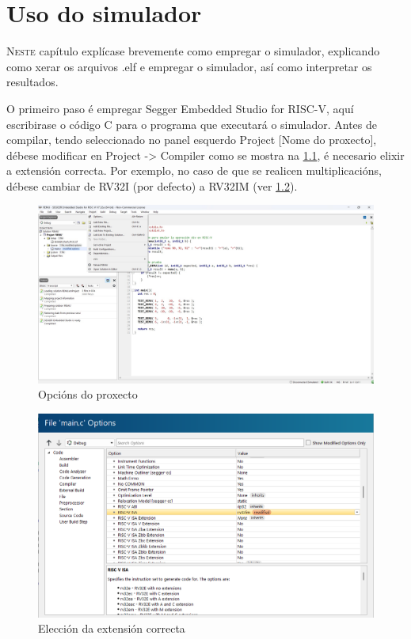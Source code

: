 \chapter{Uso do simulador}
\label{chap:uso_simulador}

\lettrine{N}{este} capítulo explícase brevemente como empregar o simulador, explicando como xerar os arquivos .elf e empregar o simulador, así como interpretar os resultados. 

O primeiro paso é empregar Segger Embedded Studio for RISC-V, aquí escribirase o código C para o programa que executará o simulador. Antes de compilar, tendo seleccionado no panel esquerdo Project [Nome do proxecto], débese modificar en Project -> Compiler como se mostra na \ref{fig:cap1}, é necesario elixir a extensión correcta. Por exemplo, no caso de que se realicen multiplicacións, débese cambiar de RV32I (por defecto) a RV32IM (ver \ref{fig:cap2}).

\begin{figure}[hp!]
  \centering
  \includegraphics[width=\textwidth]{imaxes/Cap_1.jpg}
  \caption{Opcións do proxecto}
  \label{fig:cap1}
\end{figure}

\begin{figure}[hp!]
  \centering
  \includegraphics[width=\textwidth]{imaxes/Cap_2.png}
  \caption{Elección da extensión correcta}
  \label{fig:cap2}
\end{figure}

